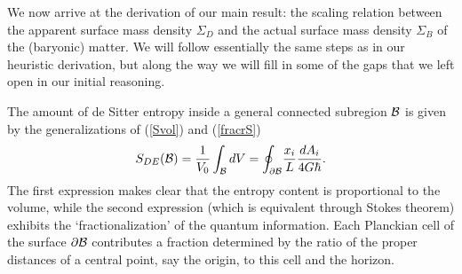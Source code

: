 \documentclass[a4paper,12pt]{article}
\newcommand{\be}{\begin{equation}}
\newcommand{\ee}{\end{equation}}
\begin{document}
  
We now arrive at  the derivation of our main result: the scaling relation between the apparent surface mass density $\Sigma_D$ and the actual surface mass density $\Sigma_B$ of the (baryonic) matter.  We will follow essentially the same steps as in our heuristic derivation, but along the way we will fill in some of the gaps that we left open in our initial reasoning.  %

The amount of de Sitter entropy inside a general connected subregion $\cal B$ is given by the generalizations of (\ref{Svol}) and (\ref{fracrS})
\be
\label{Soint}
S_{DE}({\cal B}) = {1\over V_0} \int_{\cal B}  \!  \, {dV}= \oint_{\partial {\cal B}}\! {x_i\over L} {dA_i\over 4G\hbar} .%
\ee
The first expression makes clear that the entropy content is proportional to the volume, while  the second expression (which is equivalent through Stokes theorem) exhibits the `fractionalization' of the quantum information. Each Planckian cell of the surface $\partial {\cal B}$ contributes a fraction determined by the ratio of the proper distances of a central point, say the origin, to this cell and the horizon.  
\end{document}
